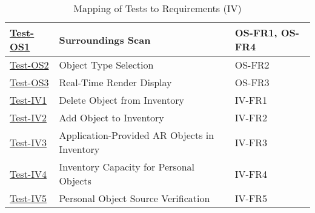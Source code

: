 \documentclass[12pt, titlepage]{article}
\begin{document}
\begin{table}[htpb!]
\begin{tabular}{|l|p{8cm}|p{3cm}|}
    \hline
    \hyperref[itm:Test-OS1]{Test-OS1}       & Surroundings Scan                                                                         & OS-FR1, OS-FR4 \\
    \hline
    \hyperref[itm:Test-OS2]{Test-OS2}       & Object Type Selection                                                                     & OS-FR2         \\
    \hline
    \hyperref[itm:Test-OS3]{Test-OS3}       & Real-Time Render Display                                                                  & OS-FR3         \\
    \hline
    \hyperref[itm:Test-IV1]{Test-IV1}       & Delete Object from Inventory                                                              & IV-FR1         \\
    \hline
    \hyperref[itm:Test-IV2]{Test-IV2}       & Add Object to Inventory                                                                   & IV-FR2         \\
    \hline
    \hyperref[itm:Test-IV3]{Test-IV3}       & Application-Provided AR Objects in Inventory                                              & IV-FR3         \\
    \hline
    \hyperref[itm:Test-IV4]{Test-IV4}       & Inventory Capacity for Personal Objects                                                   & IV-FR4         \\
    \hline
    \hyperref[itm:Test-IV5]{Test-IV5}       & Personal Object Source Verification                                                       & IV-FR5         \\
    \hline
  \end{tabular}
  \caption{Mapping of Tests to Requirements (IV)}
  \label{tab:test_requirements4}
\end{table}
\end{document}
